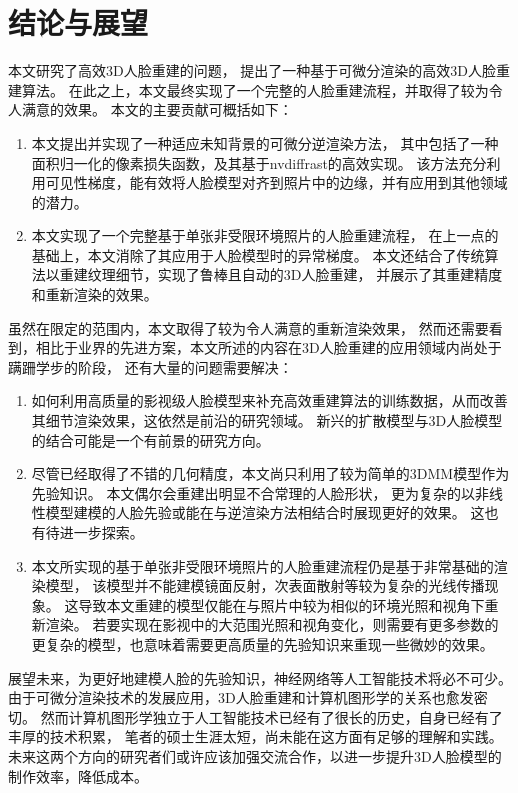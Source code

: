 \documentclass{scutmaster}
\begin{document}






{
\backmatter
\chapter{结论与展望}
\label{chap:conclusion}

本文研究了高效3D人脸重建的问题，
提出了一种基于可微分渲染的高效3D人脸重建算法。
在此之上，本文最终实现了一个完整的人脸重建流程，并取得了较为令人满意的效果。
本文的主要贡献可概括如下：
\begin{enumerate}
\item 本文提出并实现了一种适应未知背景的可微分逆渲染方法，
其中包括了一种面积归一化的像素损失函数，及其基于nvdiffrast的高效实现。
该方法充分利用可见性梯度，能有效将人脸模型对齐到照片中的边缘，并有应用到其他领域的潜力。
\item 本文实现了一个完整基于单张非受限环境照片的人脸重建流程，
在上一点的基础上，本文消除了其应用于人脸模型时的异常梯度。
本文还结合了传统算法以重建纹理细节，实现了鲁棒且自动的3D人脸重建，
并展示了其重建精度和重新渲染的效果。
\end{enumerate}

虽然在限定的范围内，本文取得了较为令人满意的重新渲染效果，
然而还需要看到，相比于业界的先进方案，本文所述的内容在3D人脸重建的应用领域内尚处于蹒跚学步的阶段，
还有大量的问题需要解决：
\begin{enumerate}
\item 如何利用高质量的影视级人脸模型来补充高效重建算法的训练数据，从而改善其细节渲染效果，这依然是前沿的研究领域。
新兴的扩散模型与3D人脸模型的结合可能是一个有前景的研究方向。
\item 尽管已经取得了不错的几何精度，本文尚只利用了较为简单的3DMM模型作为先验知识。
本文偶尔会重建出明显不合常理的人脸形状，
更为复杂的以非线性模型建模的人脸先验或能在与逆渲染方法相结合时展现更好的效果。
这也有待进一步探索。
\item 本文所实现的基于单张非受限环境照片的人脸重建流程仍是基于非常基础的渲染模型，
该模型并不能建模镜面反射，次表面散射等较为复杂的光线传播现象。
这导致本文重建的模型仅能在与照片中较为相似的环境光照和视角下重新渲染。
若要实现在影视中的大范围光照和视角变化，则需要有更多参数的更复杂的模型，也意味着需要更高质量的先验知识来重现一些微妙的效果。
\end{enumerate}

展望未来，为更好地建模人脸的先验知识，神经网络等人工智能技术将必不可少。
由于可微分渲染技术的发展应用，3D人脸重建和计算机图形学的关系也愈发密切。
然而计算机图形学独立于人工智能技术已经有了很长的历史，自身已经有了丰厚的技术积累，
笔者的硕士生涯太短，尚未能在这方面有足够的理解和实践。
未来这两个方向的研究者们或许应该加强交流合作，以进一步提升3D人脸模型的制作效率，降低成本。

}
\end{document}
